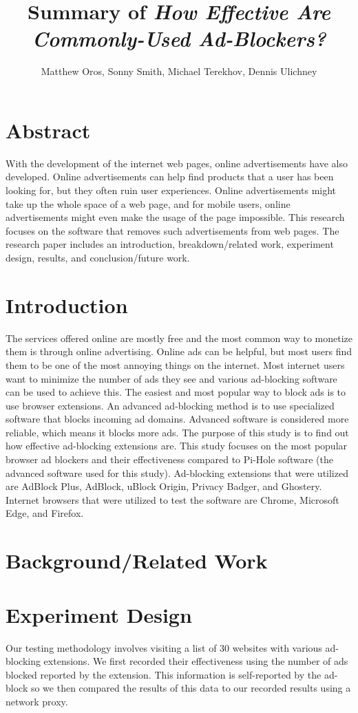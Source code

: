 \documentclass[sigsmall]{acmart}
\title{Summary of \emph{How Effective Are Commonly-Used Ad-Blockers?}}
\author{Matthew Oros, Sonny Smith, Michael Terekhov, Dennis Ulichney}
\begin{document}
\maketitle


\section*{Abstract}
With the development of the internet web pages, online advertisements have also developed. Online advertisements can help find products that a user has been looking for, but they often ruin user experiences. Online advertisements might take up the whole space of a web page, and for mobile users, online advertisements might even make the usage of the page impossible. This research focuses on the software that removes such advertisements from web pages. The research paper includes an introduction, breakdown/related work, experiment design, results, and conclusion/future work.  \cite{}

\section*{Introduction}
The services offered online are mostly free and the most common way to monetize them is through online advertising. Online ads can be helpful, but most users find them to be one of the most annoying things on the internet. Most internet users want to minimize the number of ads they see and various ad-blocking software can be used to achieve this. The easiest and most popular way to block ads is to use browser extensions. An advanced ad-blocking method is to use specialized software that blocks incoming ad domains. Advanced software is considered more reliable, which means it blocks more ads. The purpose of this study is to find out how effective ad-blocking extensions are. This study focuses on the most popular browser ad blockers and their effectiveness compared to Pi-Hole software (the advanced software used for this study). Ad-blocking extensions that were utilized are AdBlock Plus, AdBlock, uBlock Origin, Privacy Badger, and Ghostery. Internet browsers that were utilized to test the software are Chrome, Microsoft Edge, and Firefox.


\section*{Background/Related Work}


\section*{Experiment Design}
Our testing methodology involves visiting a list of 30 websites with various ad-blocking extensions. We first recorded their effectiveness using the number of ads blocked reported by the extension. This information is self-reported by the ad-block so we then compared the results of this data to our recorded results using a network proxy.
\end{document}
